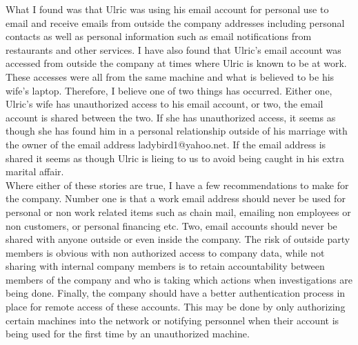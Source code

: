 \documentclass[paper=a4, fontsize=11pt]{scrartcl} %
\numberwithin{equation}{section} %
\numberwithin{figure}{section} %
\numberwithin{table}{section} %
\begin{document}
What I found was that Ulric was using his email account for personal use to email and receive
emails from outside the company addresses including personal contacts as well as personal
information such as email notifications from restaurants and other services. I have also found
that Ulric's email account was accessed from outside the company at times where Ulric is known
to be at work. These accesses were all from the same machine and what is believed to be
his wife's laptop. Therefore, I believe one of two things has occurred. Either one, Ulric's
wife has unauthorized access to his email account, or two, the email account is shared between
the two. If she has unauthorized access, it seems as though she has found him in a personal
relationship outside of his marriage with the owner of the email address ladybird1@yahoo.net.
If the email address is shared it seems as though Ulric is lieing to us to avoid being caught
in his extra marital affair.\\

Where either of these stories are true, I have a few recommendations to make for the company.
Number one is that a work email address should never be used for personal or non work related
items such as chain mail, emailing non employees or non customers, or personal financing etc.
Two, email accounts should never be shared with anyone outside or even inside the company. The
risk of outside party members is obvious with non authorized access to company data, while not
sharing with internal company members is to retain accountability between members of the company
and who is taking which actions when investigations are being done. Finally, the company should
have a better authentication process in place for remote access of these accounts. This may
be done by only authorizing certain machines into the network or notifying personnel when their
account is being used for the first time by an unauthorized machine.

\end{document}

